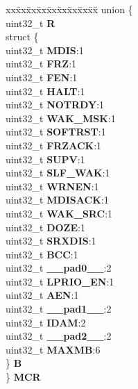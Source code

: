 \begin{DoxyCompactItemize}
\begin{tabbing}
\end{tabbing}\item 
\mbox{\label{structFLEXCAN2__tag_af015b1f4d82847d7230a2f37b25b4f77}} 
\begin{tabbing}
xx\=xx\=xx\=xx\=xx\=xx\=xx\=xx\=xx\=\kill
union \{\\
\>uint32\_t {\bfseries R}\\
\>struct \{\\
\>\>uint32\_t {\bfseries MDIS}:1\\
\>\>uint32\_t {\bfseries FRZ}:1\\
\>\>uint32\_t {\bfseries FEN}:1\\
\>\>uint32\_t {\bfseries HALT}:1\\
\>\>uint32\_t {\bfseries NOTRDY}:1\\
\>\>uint32\_t {\bfseries WAK\_MSK}:1\\
\>\>uint32\_t {\bfseries SOFTRST}:1\\
\>\>uint32\_t {\bfseries FRZACK}:1\\
\>\>uint32\_t {\bfseries SUPV}:1\\
\>\>uint32\_t {\bfseries SLF\_WAK}:1\\
\>\>uint32\_t {\bfseries WRNEN}:1\\
\>\>uint32\_t {\bfseries MDISACK}:1\\
\>\>uint32\_t {\bfseries WAK\_SRC}:1\\
\>\>uint32\_t {\bfseries DOZE}:1\\
\>\>uint32\_t {\bfseries SRXDIS}:1\\
\>\>uint32\_t {\bfseries BCC}:1\\
\>\>uint32\_t {\bfseries \_\_pad0\_\_}:2\\
\>\>uint32\_t {\bfseries LPRIO\_EN}:1\\
\>\>uint32\_t {\bfseries AEN}:1\\
\>\>uint32\_t {\bfseries \_\_pad1\_\_}:2\\
\>\>uint32\_t {\bfseries IDAM}:2\\
\>\>uint32\_t {\bfseries \_\_pad2\_\_}:2\\
\>\>uint32\_t {\bfseries MAXMB}:6\\
\>\} {\bfseries B}\\
\} {\bfseries MCR}\\


\end{tabbing}
\end{DoxyCompactItemize}
